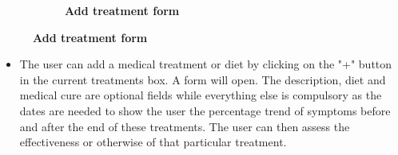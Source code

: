 \documentclass [12pt]{article}
\begin{document}
\begin{description}[leftmargin=1cm,rightmargin=1cm]
\begin{figure}[h!]
\begin{subfigure}[tr]{0.3\linewidth}
\caption{\textbf{Add treatment form}}
\end{subfigure}
\hspace*{\fill}
\end{figure}
\begin{itemize}[•]
\item The user can add a medical treatment or diet by clicking on the "+" button in the current treatments box. A form will open. The description, diet and medical cure are optional fields while everything else is compulsory as the dates are needed to show the user the percentage trend of symptoms before and after the end of these treatments. The user can then assess the effectiveness or otherwise of that particular treatment. 
\end{itemize}
\clearpage
\item [ 5)Visualize statistics]
\
\
\
\begin{figure}[h!]
\centering
\hspace*{\fill}
\begin{subfigure}[tl]{0.3\linewidth}

\end{subfigure}
\end{figure}
\end{description}
\end{document}
